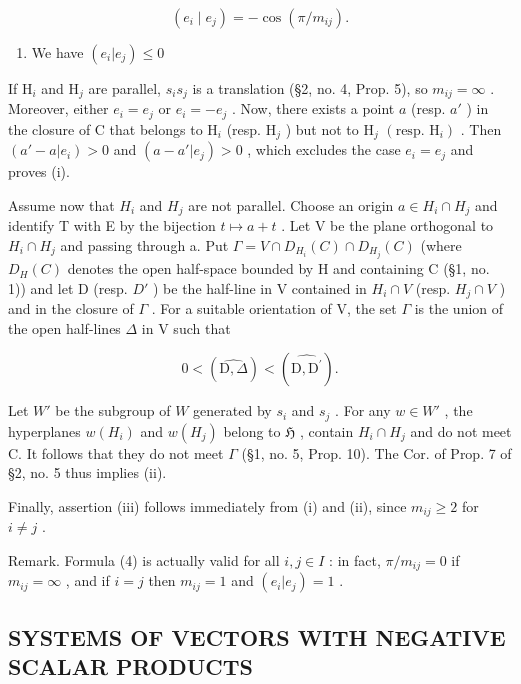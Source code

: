 \[
\left(e _ {i} \mid e _ {j}\right) = - \cos (\pi / m _ {i j}).\tag{4}
\]

\begin{enumerate}
\def\labelenumi{(\roman{enumi})}
\setcounter{enumi}{2}
\tightlist
\item
  We have \((e_i|e_j)\leqslant 0\)
\end{enumerate}

If \(\mathrm{H}_i\) and \(\mathrm{H}_j\) are parallel, \(s_i s_j\) is a translation (§2, no. 4, Prop. 5), so \(m_{ij} = \infty\) . Moreover, either \(e_i = e_j\) or \(e_i = -e_j\) . Now, there exists a point \(a\) (resp. \(a'\) ) in the closure of C that belongs to \(\mathrm{H}_i\) (resp. \(\mathrm{H}_j\) ) but not to \(\mathrm{H}_j\) \((\text{resp. } \mathrm{H}_i)\) . Then \((a' - a|e_i) > 0\) and \((a - a'|e_j) > 0\) , which excludes the case \(e_i = e_j\) and proves (i).

Assume now that \(H_{i}\) and \(H_{j}\) are not parallel. Choose an origin \(a \in H_{i} \cap H_{j}\) and identify T with E by the bijection \(t \mapsto a + t\) . Let V be the plane orthogonal to \(H_{i} \cap H_{j}\) and passing through a. Put \(\Gamma = V \cap D_{H_{i}}(C) \cap D_{H_{j}}(C)\) (where \(D_{H}(C)\) denotes the open half-space bounded by H and containing C (§1, no. 1)) and let D (resp. \(D'\) ) be the half-line in V contained in \(H_{i} \cap V\) (resp. \(H_{j} \cap V\) ) and in the closure of \(\Gamma\) . For a suitable orientation of V, the set \(\Gamma\) is the union of the open half-lines \(\Delta\) in V such that

\[
0 <   (\widehat {\mathrm{D} , \Delta}) <   (\widehat {\mathrm{D} , \mathrm{D} ^ {\prime}}).
\]

Let \(W'\) be the subgroup of \(W\) generated by \(s_i\) and \(s_j\) . For any \(w \in W'\) , the hyperplanes \(w(H_i)\) and \(w(H_j)\) belong to \(\mathfrak{H}\) , contain \(H_i \cap H_j\) and do not meet C. It follows that they do not meet \(\Gamma\) (§1, no. 5, Prop. 10). The Cor. of Prop. 7 of §2, no. 5 thus implies (ii).

Finally, assertion (iii) follows immediately from (i) and (ii), since \(m_{ij} \geqslant 2\) for \(i \neq j\) .

Remark. Formula (4) is actually valid for all \(i, j \in I\) : in fact, \(\pi / m_{ij} = 0\) if \(m_{ij} = \infty\) , and if \(i = j\) then \(m_{ij} = 1\) and \((e_i | e_j) = 1\) .

\subsection{SYSTEMS OF VECTORS WITH NEGATIVE SCALAR PRODUCTS}

